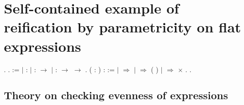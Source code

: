 \begin{coqdoccode}
\end{coqdoccode}
\section{Self-contained example of reification by parametricity on flat expressions}

\begin{coqdoccode}
\coqdocnoindent
{}  .\coqdoceol
\coqdocnoindent
{}  .\coqdoceol
\coqdocemptyline
\coqdocnoindent
{}  :=\coqdoceol
\coqdocnoindent
\ensuremath{|}  : \coqdoceol
\coqdocnoindent
\ensuremath{|}  :  \ensuremath{\rightarrow} \coqdoceol
\coqdocnoindent
\ensuremath{|}  :  \ensuremath{\rightarrow}  \ensuremath{\rightarrow} .\coqdoceol
\coqdocnoindent
{}  ( : ) : \coqdoceol
\coqdocindent{1.00em}
:=   \coqdoceol
\coqdocindent{2.50em}
\ensuremath{|}  \ensuremath{\Rightarrow} \coqdoceol
\coqdocindent{2.50em}
\ensuremath{|}   \ensuremath{\Rightarrow}  ( )\coqdoceol
\coqdocindent{2.50em}
\ensuremath{|}    \ensuremath{\Rightarrow}   \ensuremath{\times}  \coqdoceol
\coqdocindent{2.50em}
.\coqdoceol
\coqdocemptyline
\coqdocnoindent
{}  .\coqdoceol
\end{coqdoccode}
\subsection{Theory on checking evenness of expressions}

